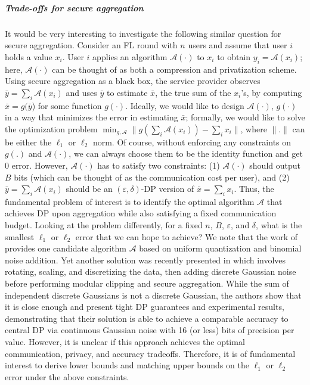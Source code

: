 \subparagraph{Trade-offs for secure aggregation} It would be very interesting to investigate the following similar question for secure aggregation. Consider an FL round with $n$ users and assume that user $i$ holds a value $x_i$. User $i$ applies an algorithm $\mathcal{A}(\cdot)$ to $x_i$ to obtain $y_i = \mathcal{A}(x_i)$; here, $\mathcal{A}(\cdot)$ can be thought of as both a compression and privatization scheme. Using secure aggregation as a black box, the service provider observes $\bar{y} = \sum_i \mathcal{A}(x_i)$ and uses $\bar{y}$ to estimate $\bar{x}$, the true sum of the $x_i$'s, by computing $\hat{\bar{x}} = g(\bar{y}$) for some function $g(\cdot)$. Ideally, we would like to design $\mathcal{A}(\cdot)$, $g(\cdot)$ in a way that minimizes the error in estimating $\bar{x}$; formally, we would like to solve the optimization problem $\min_{g,\mathcal{A}} \|g(\sum_i \mathcal{A}(x_i)) - \sum_i x_i\|$, where $\|.\|$ can be either the $\ell_1$ or $\ell_2$ norm. Of course, without enforcing any constraints on $g(.)$ and $\mathcal{A}(\cdot)$, we can always choose them to be the identity function and get $0$ error. However, $\mathcal{A}(\cdot)$ has to satisfy two constraints: (1) $\mathcal{A}(\cdot)$ should output $B$ bits (which can be thought of as the communication cost per user), and (2) $\bar{y} = \sum_i \mathcal{A}(x_i)$ should be an $(\varepsilon, \delta)$-DP version of $\bar{x} = \sum_i x_i$. Thus, the fundamental problem of interest is to identify the optimal algorithm $\mathcal{A}$ that achieves DP upon aggregation while also satisfying a fixed communication budget. Looking at the problem differently, for a fixed $n$, $B$, $\varepsilon$, and $\delta$, what is the smallest $\ell_1$ or $\ell_2$ error that we can hope to achieve? We note that the work of \citet{agarwal2018cpsgd} provides one candidate algorithm $\mathcal{A}$ based on uniform quantization and binomial noise addition. Yet another solution was recently presented in \cite{kairouz2021distributed} which involves rotating, scaling, and discretizing the data, then adding discrete Gaussian noise before performing modular clipping and secure aggregation. While the sum of independent discrete Gaussians is not a discrete Gaussian, the authors show that it is close enough and present tight DP guarantees and experimental results, demonstrating that their solution is able to achieve a comparable accuracy to central DP via continuous Gaussian noise with 16 (or less) bits of precision per value. However, it is unclear if this approach achieves the optimal communication, privacy, and accuracy tradeoffs. Therefore, it is of fundamental interest to derive lower bounds and matching upper bounds on the $\ell_1$ or $\ell_2$ error under the above constraints.

